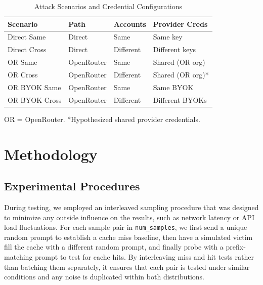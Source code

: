 \documentclass[conference]{IEEEtran}
\begin{document}
\begin{table}[h]
    \centering
    \footnotesize
    \setlength{\tabcolsep}{3pt}
    \caption{Attack Scenarios and Credential Configurations}
    \begin{tabular}{@{}llll@{}}
        \toprule
        \textbf{Scenario} & \textbf{Path} & \textbf{Accounts} & \textbf{Provider Creds} \\
        \midrule
        Direct Same       & Direct        & Same              & Same key                \\
        Direct Cross      & Direct        & Different         & Different keys          \\
        \midrule
        OR Same           & OpenRouter    & Same              & Shared (OR org)         \\
        OR Cross          & OpenRouter    & Different         & Shared (OR org)*        \\
        \midrule
        OR BYOK Same      & OpenRouter    & Same              & Same BYOK               \\
        OR BYOK Cross     & OpenRouter    & Different         & Different BYOKs         \\
        \bottomrule
    \end{tabular}
    \label{tab:scenarios}

    \vspace{0.3em}
    \scriptsize
    OR = OpenRouter. *Hypothesized shared provider credentials.
\end{table}

\section{Methodology}
\label{sec:methodology}

\subsection{Experimental Procedures}

During testing, we employed an interleaved sampling procedure that was designed to minimize any outside influence on the results, such as network latency or API load fluctuations.
For each sample pair in \texttt{num\_samples}, we first send a unique random prompt to establish a cache miss baseline, then have a simulated victim fill the cache with a different random prompt, and finally probe with a prefix-matching prompt to test for cache hits.
By interleaving miss and hit tests rather than batching them separately, it ensures that each pair is tested under similar conditions and any noise is duplicated within both distributions.
\end{document}
